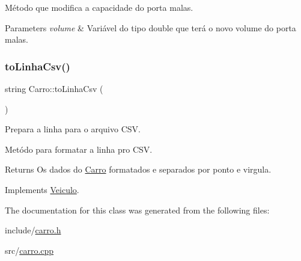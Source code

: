 Método que modifica a capacidade do porta malas. 


\begin{DoxyParams}{Parameters}
{\em volume} & Variável do tipo double que terá o novo volume do porta malas. \\
\hline
\end{DoxyParams}
\mbox{\label{classCarro_ab41a71fde77e7c2c7a1d6f7fa9899970}} 
\subsubsection{\texorpdfstring{to\+Linha\+Csv()}{toLinhaCsv()}}
{\footnotesize\ttfamily string Carro\+::to\+Linha\+Csv (\begin{DoxyParamCaption}{ }\end{DoxyParamCaption})\hspace{0.3cm}{\ttfamily [virtual]}}



Prepara a linha para o arquivo C\+SV. 

Metódo para formatar a linha pro C\+SV.

\begin{DoxyReturn}{Returns}
Os dados do \hyperlink{classCarro}{Carro} formatados e separados por ponto e virgula. 
\end{DoxyReturn}


Implements \hyperlink{classVeiculo}{Veiculo}.



The documentation for this class was generated from the following files\+:\begin{DoxyCompactItemize}
\item 
include/\hyperlink{carro_8h}{carro.\+h}\item 
src/\hyperlink{carro_8cpp}{carro.\+cpp}\end{DoxyCompactItemize}
